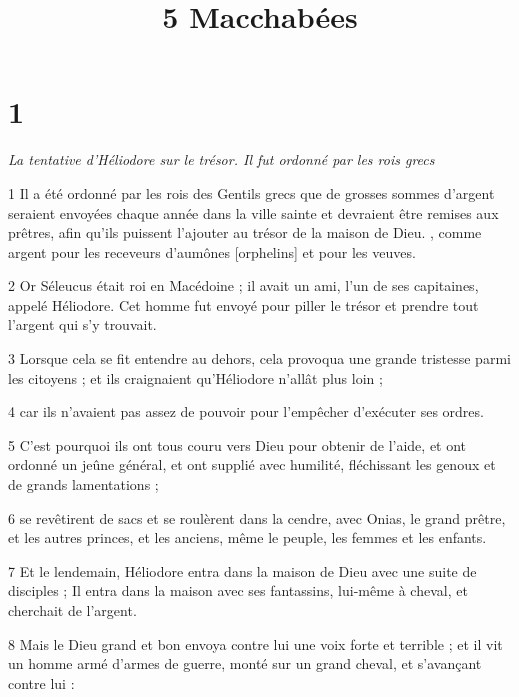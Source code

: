 

\title{5 Macchabées}


\chapter{1}

\par \textit {La tentative d'Héliodore sur le trésor. Il fut ordonné par les rois grecs}

\par 1 Il a été ordonné par les rois des Gentils grecs que de grosses sommes d'argent seraient envoyées chaque année dans la ville sainte et devraient être remises aux prêtres, afin qu'ils puissent l'ajouter au trésor de la maison de Dieu. , comme argent pour les receveurs d'aumônes [orphelins] et pour les veuves.

\par 2 Or Séleucus était roi en Macédoine ; il avait un ami, l'un de ses capitaines, appelé Héliodore. Cet homme fut envoyé pour piller le trésor et prendre tout l'argent qui s'y trouvait.

\par 3 Lorsque cela se fit entendre au dehors, cela provoqua une grande tristesse parmi les citoyens ; et ils craignaient qu'Héliodore n'allât plus loin ;

\par 4 car ils n'avaient pas assez de pouvoir pour l'empêcher d'exécuter ses ordres.

\par 5 C'est pourquoi ils ont tous couru vers Dieu pour obtenir de l'aide, et ont ordonné un jeûne général, et ont supplié avec humilité, fléchissant les genoux et de grands lamentations ;

\par 6 se revêtirent de sacs et se roulèrent dans la cendre, avec Onias, le grand prêtre, et les autres princes, et les anciens, même le peuple, les femmes et les enfants.

\par 7 Et le lendemain, Héliodore entra dans la maison de Dieu avec une suite de disciples ; Il entra dans la maison avec ses fantassins, lui-même à cheval, et cherchait de l'argent.

\par 8 Mais le Dieu grand et bon envoya contre lui une voix forte et terrible ; et il vit un homme armé d'armes de guerre, monté sur un grand cheval, et s'avançant contre lui :

